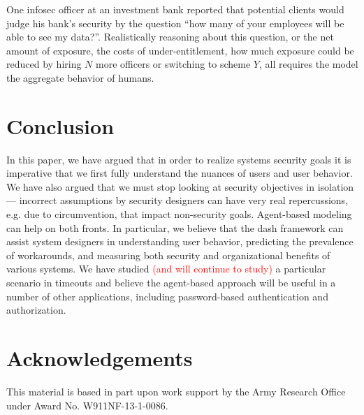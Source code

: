 \documentclass{acm_proc_article-sp}
\newcommand{\ignore}[1] {}
\begin{document}
One infosec officer at an investment bank reported that potential
clients would judge his bank's security by the question ``how many of
your employees will be able to see my data?''.  Realistically
reasoning about this question, or the net amount of exposure, the
costs of under-entitlement, how much exposure could be reduced by
hiring $N$ more officers or switching to scheme $Y$, all requires the
model the aggregate behavior of humans.



\ignore{(Indeed, X.509 PKI has often been lamented as costing too many
man-hours when deployed in practice, in large enterprises.  Could our
approach help explain this, and then help guide designers to reduce
these costs?)}

\ignore{BCMA....}

\section{Conclusion}
\label{sec-conclusion}

In this paper, we have argued that in order to realize systems
security goals it is imperative that we first fully understand the
nuances of users and user behavior.  We have also argued that we must
stop looking at security objectives in isolation --- incorrect
assumptions by security designers can have very real repercussions,
e.g. due to circumvention, that impact non-security goals. Agent-based
modeling can help on both fronts. In particular, we believe that the
{\sc dash} framework can assist system designers in understanding user
behavior, predicting the prevalence of workarounds, and measuring both
security and organizational benefits of various systems. We have
studied \textcolor{red}{(and will continue to study)} a particular scenario in timeouts and believe the agent-based
approach will be useful in a number of other applications, including
password-based authentication and authorization.

\section{Acknowledgements}
\label{sec-acks}

This material is based in part upon work support by the Army Research Office under Award No. W911NF-13-1-0086.

\small

\nocite{*}



\end{document}
